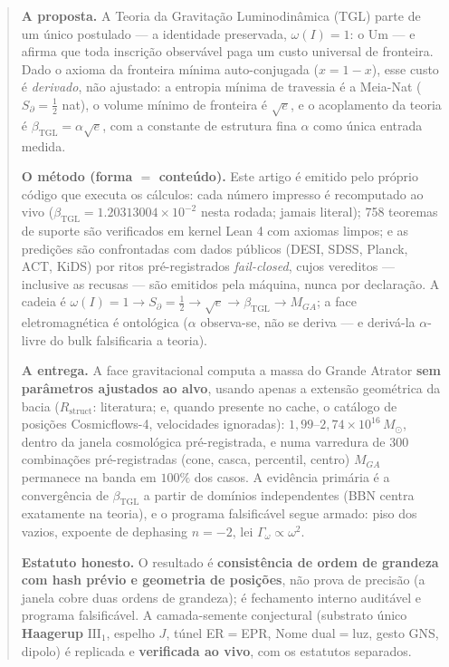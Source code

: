 \documentclass[11pt]{article}
\newcommand{\bTGL}{\beta_{\mathrm{TGL}}}\newcommand{\Msun}{M_{\odot}}\newcommand{\TGL}{\mathrm{TGL}}
\theoremstyle{definition}\newtheorem{deriv}{Derivação}
\begin{document}
\begin{abstract}

\textbf{A proposta.} A Teoria da Gravitação Luminodinâmica (TGL) parte de um único postulado --- a identidade preservada, $\omega(I)=1$: o Um --- e afirma que toda inscrição observável paga um custo universal de fronteira. Dado o axioma da fronteira mínima auto-conjugada ($x=1-x$), esse custo é \emph{derivado}, não ajustado: a entropia mínima de travessia é a Meia-Nat ($S_\partial=\tfrac12$ nat), o volume mínimo de fronteira é $\sqrt e$, e o acoplamento da teoria é $\bTGL=\alpha\sqrt e$, com a constante de estrutura fina $\alpha$ como única entrada medida.

\textbf{O método (forma $=$ conteúdo).} Este artigo é emitido pelo próprio código que executa os cálculos: cada número impresso é recomputado ao vivo ($\bTGL=1.20313004\times10^{-2}$ nesta rodada; jamais literal); 758 teoremas de suporte são verificados em kernel Lean 4 com axiomas limpos; e as predições são confrontadas com dados públicos (DESI, SDSS, Planck, ACT, KiDS) por ritos pré-registrados \emph{fail-closed}, cujos vereditos --- inclusive as recusas --- são emitidos pela máquina, nunca por declaração. A cadeia é $\omega(I)=1\to S_\partial=\tfrac12\to\sqrt e\to\bTGL\to M_{GA}$; a face eletromagnética é ontológica ($\alpha$ observa-se, não se deriva --- e derivá-la $\alpha$-livre do bulk falsificaria a teoria).

\textbf{A entrega.} A face gravitacional computa a massa do Grande Atrator \textbf{sem parâmetros ajustados ao alvo}, usando apenas a extensão geométrica da bacia ($R_{\mathrm{struct}}$: literatura; e, quando presente no cache, o catálogo de posições Cosmicflows-4, velocidades ignoradas): $1{,}99$--$2{,}74\times10^{16}\,\Msun$, dentro da janela cosmológica pré-registrada, e numa varredura de $300$ combinações pré-registradas (cone, casca, percentil, centro) $M_{GA}$ permanece na banda em $100\%$ dos casos. A evidência primária é a convergência de $\bTGL$ a partir de domínios independentes (BBN centra exatamente na teoria), e o programa falsificável segue armado: piso dos vazios, expoente de dephasing $n=-2$, lei $\Gamma_\omega\propto\omega^2$.

\textbf{Estatuto honesto.} O resultado é \textbf{consistência de ordem de grandeza com hash prévio e geometria de posições}, não prova de precisão (a janela cobre duas ordens de grandeza); é fechamento interno auditável e programa falsificável. A camada-semente conjectural (substrato único \textbf{Haagerup} $\mathrm{III}_1$, espelho $J$, túnel ER$=$EPR, Nome dual$=$luz, gesto GNS, dipolo) é replicada e \textbf{verificada ao vivo}, com os estatutos separados.

\end{abstract}
\end{document}
